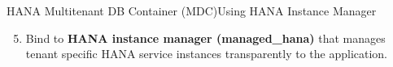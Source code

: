 \begin{frame}[t]{HANA Multitenant DB Container (MDC)}{Using HANA Instance Manager}
\small
\begin{enumerate}
\setcounter{enumi}{4}
\item Bind to \textbf{HANA instance manager (managed\_hana)} that manages tenant specific HANA service instances transparently to the application.

\end{enumerate}
\vfill
{}
\end{frame}



